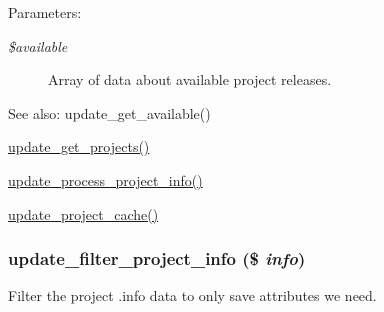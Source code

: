 \begin{Desc}
\item[Parameters:]
\begin{description}
\item[{\em \$available}]Array of data about available project releases.\end{description}
\end{Desc}
\begin{Desc}
\item[See also:]update\_\-get\_\-available() 

\hyperlink{update_8compare_8inc_7e1ea49d91f2d2b81b8101d481d10300}{update\_\-get\_\-projects()} 

\hyperlink{update_8compare_8inc_d14173209d3e9cf76fbd6d6d1977de05}{update\_\-process\_\-project\_\-info()} 

\hyperlink{update_8compare_8inc_958705ecce49b020722280decff3f644}{update\_\-project\_\-cache()} \end{Desc}
\hypertarget{update_8compare_8inc_8d1c29cf668adf2ea2a1a34f0f716cd1}{
\subsubsection[{update\_\-filter\_\-project\_\-info}]{\setlength{\rightskip}{0pt plus 5cm}update\_\-filter\_\-project\_\-info (\$ {\em info})}}
\label{update_8compare_8inc_8d1c29cf668adf2ea2a1a34f0f716cd1}


Filter the project .info data to only save attributes we need.

